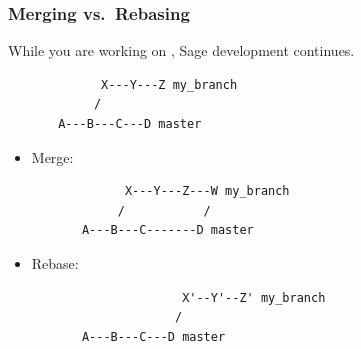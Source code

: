 {
  \begin{frame}[plain]
  \end{frame}
}




\begin{frame}[fragile]
  \frametitle{Merging vs.\ Rebasing}

  While you are working on , Sage development
  continues.
\begin{verbatim}
             X---Y---Z my_branch
            /
       A---B---C---D master
\end{verbatim}
  \begin{itemize}
  \item<2-> Merge: 
\begin{verbatim}
             X---Y---Z---W my_branch
            /           /
       A---B---C-------D master
\end{verbatim}
  \item<3-> Rebase: 
\begin{verbatim}
                     X'--Y'--Z' my_branch
                    /
       A---B---C---D master
\end{verbatim}
  \end{itemize}
  
\end{frame}





